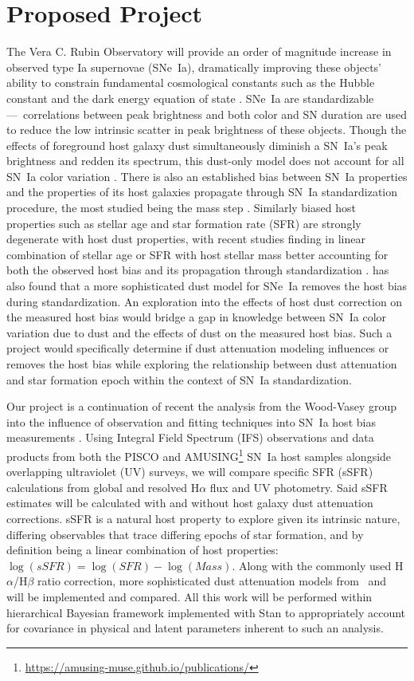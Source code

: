 \documentclass[modern]{aastex63}
\begin{document}
\section{Proposed Project}
The Vera C. Rubin Observatory will provide an order of magnitude increase in observed type Ia supernovae (SNe~Ia), dramatically improving these objects' ability to constrain fundamental cosmological constants such as the Hubble constant and the dark energy equation of state \citep{Perlmutter1999}.  
SNe~Ia are standardizable ---~correlations between peak brightness and both color and SN duration are used to reduce the low intrinsic scatter in peak brightness of these objects.  
Though the effects of foreground host galaxy dust simultaneously diminish a SN~Ia's peak brightness and redden its spectrum, this dust-only model does not account for all SN~Ia color variation \citep{Brout2021}.  
There is also an established bias between SN~Ia properties and the properties of its host galaxies propagate through SN~Ia standardization procedure, the most studied being the mass step \citep{Sullivan2010}. 
Similarly biased host properties such as stellar age and star formation rate (SFR) are strongly degenerate with host dust properties, with recent studies finding in linear combination of stellar age or SFR with host stellar mass better accounting for both the observed host bias and its propagation through standardization \citep{Rigault2018,Rose2021}. 
\cite{Brout2021} has also found that a more sophisticated dust model for SNe~Ia removes the host bias during standardization.
An exploration into the effects of host dust correction on the measured host bias would bridge a gap in knowledge between SN~Ia color variation due to dust and the effects of dust on the measured host bias. 
Such a project would specifically determine if dust attenuation modeling influences or removes the host bias while exploring the relationship between dust attenuation and star formation epoch within the context of SN~Ia standardization.

Our project is a continuation of recent the analysis from the Wood-Vasey group into the influence of observation and fitting techniques into SN~Ia host bias measurements \citep{Hand2021}.
Using Integral Field Spectrum (IFS) observations and data products from both the PISCO \citep{Galbany2018} and AMUSING\footnote{\url{https://amusing-muse.github.io/publications/}} SN~Ia host samples alongside overlapping ultraviolet (UV) surveys, we will compare specific SFR (sSFR) calculations from global and resolved H$\alpha$ flux and UV photometry.
Said sSFR estimates will be calculated with and without host galaxy dust attenuation corrections.
sSFR is a natural host property to explore given its intrinsic nature, differing observables that trace differing epochs of star formation, and by definition being a linear combination of host properties: $\log(sSFR) = \log(SFR) - \log(Mass)$.
Along with the commonly used H$\alpha$/H$\beta$ ratio correction, more sophisticated dust attenuation models from~\cite{Salim2018} and~\cite{Narayanan2018} will be implemented and compared.  
All this work will be performed within hierarchical Bayesian framework implemented with Stan to appropriately account for covariance in physical and latent parameters inherent to such an analysis.



\end{document}
